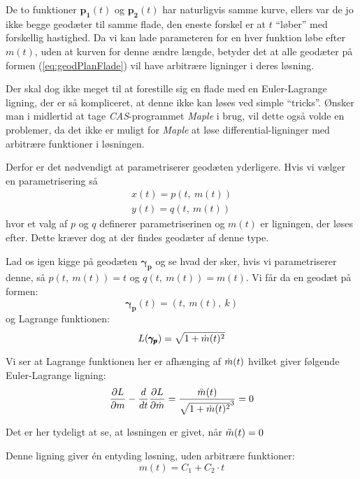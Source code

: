 De to funktioner \(\pmb{p_1}(t)\) og \(\pmb{p_2}(t)\) har naturligvis samme kurve,
ellers var de jo ikke begge geodæter til samme flade, den eneste forskel er at \(t\) ``løber'' med forskellig hastighed.
Da vi kan lade parameteren for en hver funktion løbe efter \(m(t)\), uden at kurven for denne ændre længde,
betyder det at alle geodæter på formen (\ref{eq:geodPlanFlade}) vil have arbitrære ligninger i deres løsning.

Der skal dog ikke meget til at forestille sig en flade med en Euler-Lagrange ligning, der er så kompliceret,
at denne ikke kan løses ved simple ``tricks''. Ønsker man i midlertid at tage \emph{CAS}-programmet \emph{Maple}
i brug, vil dette også volde en problemer,
da det ikke er muligt for \emph{Maple} at løse differential-ligninger med arbitrære funktioner i løsningen.

Derfor er det nødvendigt at parametriserer geodæten yderligere. Hvis vi vælger en parametrisering så
\begin{gather*}
x(t) = p(t,~m(t))\\
y(t) = q(t,~m(t))
\end{gather*}
hvor et valg af \(p\) og \(q\) definerer parametriserinen og \(m(t)\) er ligningen, der løses efter.
Dette kræver dog at der findes geodæter af denne type.

Lad os igen kigge på geodæten \(\pmb{\gamma_p}\) og se hvad der sker,
hvis vi parametriserer denne,
så \(p(t,~m(t) ) = t\) og \(q(t,~m(t) ) = m(t)\).
Vi får da en geodæt på formen:
\begin{equation*}
\pmb{\gamma_p}(t) = (t,~m(t),~k)
\end{equation*}
%
og Lagrange funktionen:
\begin{equation*}
L(\pmb{\gamma_p}) = \sqrt{ 1 + \dot{m}(t)^2 }
\end{equation*}

Vi ser at Lagrange funktionen her er afhænging af \(\dot{m}(t)\) 
hvilket giver følgende Euler-Lagrange ligning:
\begin{equation*}
\frac{\partial L}{\partial m} - \frac{d}{d t} \frac{\partial L}{\partial \dot{m}} = 
\frac{\ddot{m}(t)}{\sqrt{1 + \dot{m}(t)^2}^3} = 0\\
\end{equation*}

Det er her tydeligt at se, at løsningen er givet, når \(\ddot{m}(t) = 0\)

Denne ligning giver én entyding løsning, uden arbitrære funktioner:
\begin{equation*}
m(t) = C_1 + C_2 \cdot t
\end{equation*}

